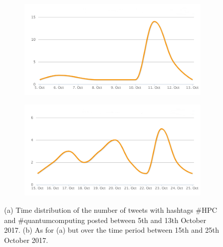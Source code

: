 \begin{figure}
 \centering
 \begin{subfigure}[b]{0.9\textwidth}
   \includegraphics[width=1\linewidth]{Images/FirstSearch_HPC-QuantumComputing.png}
   \caption{} 
 \end{subfigure}

 \begin{subfigure}[b]{0.9\textwidth}
   \includegraphics[width=1\linewidth]{Images/SecondSearch_HPC-QuantumComputing.png}
   \caption{}
 \end{subfigure}
 \caption{(a) Time distribution of the number of tweets with hashtags \#HPC and \#quantumcomputing posted between 5th and 13th October 2017. (b) As for (a) but over the time period between 15th and 25th October 2017.} 
 \label{First-SecondSearch_HPC-QuantumComputing}
\end{figure}

